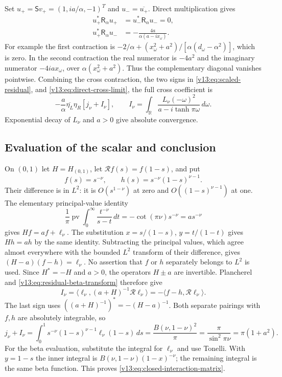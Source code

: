 Set $u_+=\mathsf Sv_+=(1,ia/\alpha,-1)^T$ and
$u_-=\overline{u_+}$.  Direct multiplication gives
\begin{align*}
 u_+^*\mathsf R_\alpha u_+
  &=u_-^*\mathsf R_\alpha u_-=0,\\
 u_+^*\mathsf R_\alpha u_-
  &=-\frac{4a}{\alpha(a-ix_\omega)}.
\end{align*}
For example the first contraction is
$-2/\alpha+(x_\omega^2+a^2)/[\alpha(d_\omega-\alpha^2)]$,
which is zero.  In the second contraction the real numerator is
$-4a^2$ and the imaginary numerator $-4iax_\omega$, over
$\alpha(x_\omega^2+a^2)$.  Thus the complementary diagonal vanishes
pointwise.  Combining the cross contraction, the two signs in
\eqref{v13:eq:scaled-residual}, and
\eqref{v13:eq:direct-cross-limit}, the full cross coefficient is
\begin{equation}\label{v13:eq:unevaluated-cross-coefficient}
 -\frac a\alpha\overline{\eta_L}\eta_R
 \left[j_\nu+I_\nu\right],\qquad
 I_\nu=\int_{\mathbb R}
    \frac{L_\nu(-\omega)^2}{a-i\tanh\pi\omega}\,d\omega.
\end{equation}
Exponential decay of $L_\nu$ and $a>0$ give absolute convergence.

\subsection{Evaluation of the scalar and conclusion}

On $(0,1)$ let $H=H_{(0,1)}$, let $\mathcal Rf(s)=f(1-s)$, and put
\[
 f(s)=s^{-\nu},\qquad h(s)=s^{-\nu}(1-s)^{\nu-1}.
\]
Their difference is in $L^2$: it is $O(s^{1-\nu})$ at zero and
$O((1-s)^{\nu-1})$ at one.  The elementary principal-value identity
\[
 \frac1\pi\operatorname{pv}\int_0^\infty
     \frac{t^{-\nu}}{s-t}\,dt=-\cot(\pi\nu)s^{-\nu}=as^{-\nu}
\]
gives $Hf=af+\ell_\nu$.  The substitution
$x=s/(1-s)$, $y=t/(1-t)$ gives $Hh=ah$ by the same identity.
Subtracting the principal values, which agree almost everywhere with
the bounded $L^2$ transform of their difference, gives
$(H-a)(f-h)=\ell_\nu$.  No assertion that $f$ or $h$ separately
belongs to $L^2$ is used.  Since $H^*=-H$ and $a>0$, the operators
$H\pm a$ are invertible.  Plancherel and
\eqref{v13:eq:residual-beta-transform} therefore give
\[
 I_\nu=\langle\ell_\nu,(a+H)^{-1}\mathcal R\ell_\nu\rangle
      =-\langle f-h,\mathcal R\ell_\nu\rangle.
\]
The last sign uses $((a+H)^{-1})^*=-(H-a)^{-1}$.
Both separate pairings with $f,h$ are absolutely integrable, so
\[
 j_\nu+I_\nu=\int_0^1s^{-\nu}(1-s)^{\nu-1}\ell_\nu(1-s)\,ds
            =\frac{B(\nu,1-\nu)^2}{\pi}
            =\frac\pi{\sin^2\pi\nu}=\pi(1+a^2).
\]
For the beta evaluation, substitute the integral for $\ell_\nu$ and
use Tonelli.  With $y=1-s$ the inner integral is
$B(\nu,1-\nu)(1-x)^{-\nu}$; the remaining integral is the same
beta function.  This proves
\eqref{v13:eq:closed-interaction-matrix}.

